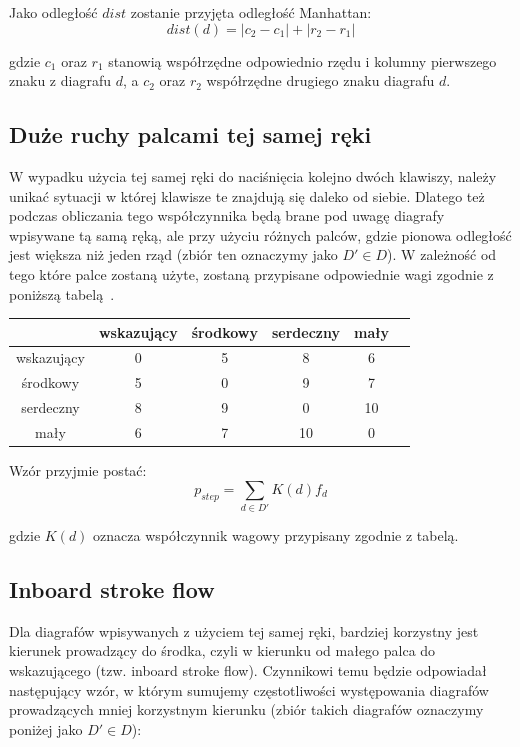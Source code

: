 \documentclass[brudnopis]{xmgr}
\begin{document}
Jako odległość $dist$ zostanie przyjęta odległość Manhattan:
$$ dist(d) = |c_2 - c_1| + |r_2 - r_1| $$

gdzie $c_1$ oraz $r_1$ stanowią współrzędne odpowiednio rzędu i kolumny pierwszego znaku z diagrafu $d$, a $c_2$ oraz $r_2$ współrzędne drugiego znaku diagrafu $d$.


\subsection{Duże ruchy palcami tej samej ręki}

W wypadku użycia tej samej ręki do naciśnięcia kolejno dwóch klawiszy, należy unikać sytuacji w której klawisze te znajdują się daleko od siebie. Dlatego też podczas obliczania tego współczynnika będą brane pod uwagę diagrafy wpisywane tą samą ręką, ale przy użyciu różnych palców, gdzie pionowa odległość jest większa niż jeden rząd (zbiór ten oznaczymy jako $ D' \in D $). W zależność od tego które palce zostaną użyte, zostaną przypisane odpowiednie wagi zgodnie z poniższą tabelą~\cite{AntColony:2002:ACO}.\newline

\begin{tabular}{ c | c | c | c | c | c }
  & wskazujący & środkowy & serdeczny & mały \\
  \hline
  wskazujący & 0 & 5 & 8 & 6 \\
  środkowy & 5 & 0 & 9 & 7 \\
  serdeczny & 8 & 9 & 0 & 10 \\
  mały & 6 & 7 & 10 & 0 \\
\end{tabular}\newline\newline

Wzór przyjmie postać:
$$ p_{step} = \sum\limits_{d \in D'} K(d) f_d $$

gdzie $K(d)$ oznacza współczynnik wagowy przypisany zgodnie z tabelą.


\subsection{Inboard stroke flow}

Dla diagrafów wpisywanych z użyciem tej samej ręki, bardziej korzystny jest kierunek prowadzący do środka, czyli w kierunku od małego palca do wskazującego (tzw. inboard stroke flow). Czynnikowi temu będzie odpowiadał następujący wzór, w którym sumujemy częstotliwości występowania diagrafów prowadzących mniej korzystnym kierunku (zbiór takich diagrafów oznaczymy poniżej jako $ D' \in D $):
\end{document}

